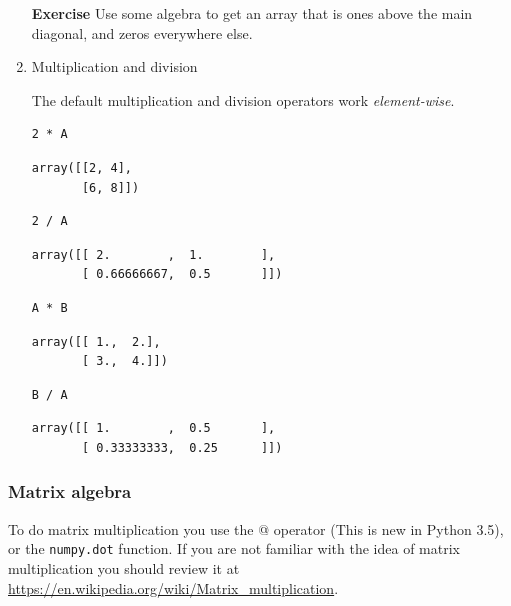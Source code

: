 \documentclass[11pt]{article}
\begin{document}
\begin{enumerate}
\textbf{Exercise} Use some algebra to get an array that is ones above the main diagonal, and zeros everywhere else.

\item Multiplication and division
\label{sec:org10573ff}

The default multiplication and division operators work \emph{element-wise}.

\begin{verbatim}
2 * A
\end{verbatim}

\begin{verbatim}
array([[2, 4],
       [6, 8]])
\end{verbatim}

\begin{verbatim}
2 / A
\end{verbatim}

\begin{verbatim}
array([[ 2.        ,  1.        ],
       [ 0.66666667,  0.5       ]])
\end{verbatim}

\begin{verbatim}
A * B
\end{verbatim}

\begin{verbatim}
array([[ 1.,  2.],
       [ 3.,  4.]])
\end{verbatim}

\begin{verbatim}
B / A
\end{verbatim}

\begin{verbatim}
array([[ 1.        ,  0.5       ],
       [ 0.33333333,  0.25      ]])
\end{verbatim}
\end{enumerate}


\subsubsection{Matrix algebra}
\label{sec:org321bd0a}

To do matrix multiplication you use the @ operator (This is new in Python 3.5), or the \texttt{numpy.dot} function. If you are not familiar with the idea of matrix multiplication you should review it at \url{https://en.wikipedia.org/wiki/Matrix\_multiplication}.
\end{document}
